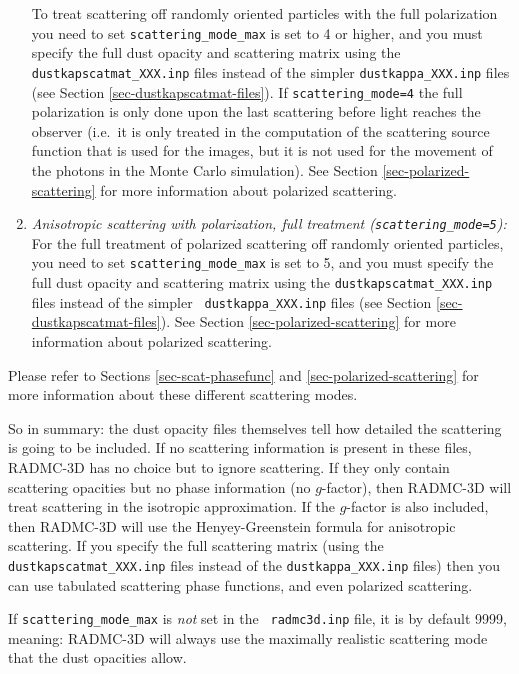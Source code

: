\documentclass{report}
\begin{document}
\begin{enumerate}
  To treat scattering off randomly oriented particles with the full
  polarization you need to set {\small\tt scattering\_mode\_max} is set to 4
  or higher, and you must specify the full dust opacity and scattering
  matrix using the {\small\tt dustkapscatmat\_XXX.inp} files instead of the
  simpler {\small\tt dustkappa\_XXX.inp} files (see Section
  \ref{sec-dustkapscatmat-files}). If {\small\tt scattering\_mode=4} the
  full polarization is only done upon the last scattering before light
  reaches the observer (i.e.\ it is only treated in the computation of
  the scattering source function that is used for the images, but it is
  not used for the movement of the photons in the Monte Carlo simulation).
  See Section \ref{sec-polarized-scattering} for more information about
  polarized scattering.
\item {\em Anisotropic scattering with polarization, full treatment ({\small\tt scattering\_mode=5}):}\\
  For the full treatment of polarized scattering off randomly oriented
  particles, you need to set {\small\tt scattering\_mode\_max} is set to 5,
  and you must specify the full dust opacity and scattering matrix using the
  {\small\tt dustkapscatmat\_XXX.inp} files instead of the simpler {\small\tt
    dustkappa\_XXX.inp} files (see Section \ref{sec-dustkapscatmat-files}).
  See Section \ref{sec-polarized-scattering} for more information about
  polarized scattering.
\end{enumerate}
Please refer to Sections \ref{sec-scat-phasefunc} and
\ref{sec-polarized-scattering} for more information about these different
scattering modes.

So in summary: the dust opacity files themselves tell how detailed the
scattering is going to be included. If no scattering information is present
in these files, RADMC-3D has no choice but to ignore scattering. If they
only contain scattering opacities but no phase information (no $g$-factor),
then RADMC-3D will treat scattering in the isotropic approximation. If 
the $g$-factor is also included, then RADMC-3D will use the Henyey-Greenstein
formula for anisotropic scattering. If you specify the full scattering
matrix (using the {\small\tt dustkapscatmat\_XXX.inp} files instead of
the {\small\tt dustkappa\_XXX.inp} files) then you can use tabulated
scattering phase functions, and even polarized scattering. 

If {\small\tt scattering\_mode\_max} is {\em not} set in the {\small\tt
radmc3d.inp} file, it is by default 9999, meaning: RADMC-3D will always
use the maximally realistic scattering mode that the dust opacities
allow.
\end{document}
